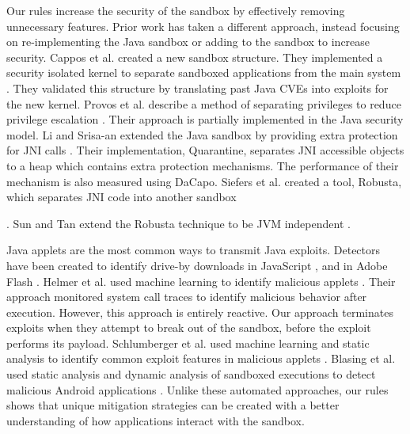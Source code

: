 \documentclass{sig-alternate}
\begin{document}
Our rules increase the security of the sandbox
by effectively removing unnecessary features. Prior work has taken a different
approach, instead focusing on re-implementing the Java sandbox or
adding to the sandbox to increase security. Cappos et al. created
a new sandbox structure. They implemented a security isolated kernel
to separate sandboxed applications from the main system \cite{cappos_retaining_2010}.
They validated this structure by translating past Java CVEs into exploits
for the new kernel. Provos et al. describe a method of separating
privileges to reduce privilege escalation \cite{Provos-PrivilegeEscalation}.
Their approach is partially implemented in the Java security model.
Li and Srisa-an extended the Java sandbox by providing extra protection
for JNI calls \cite{li_quarantine:_2011}. Their implementation, Quarantine,
separates JNI accessible objects to a heap which contains extra protection
mechanisms. The performance of their mechanism is also measured using
DaCapo. Siefers et al. created a tool, Robusta, which separates JNI
code into another sandbox \cite{siefers_robusta:_2010}%

. Sun and Tan extend the Robusta technique to be JVM independent \cite{sun_jvm-portable_2012}. 

Java applets are the most common ways to transmit Java exploits. Detectors
have been created to identify drive-by downloads in JavaScript \cite{cova_detection_2010},
and in Adobe Flash \cite{ford_analyzing_2009}. Helmer et al. used
machine learning to identify malicious applets \cite{helmer_anomalous_2001}.
Their approach monitored system call traces to identify malicious
behavior after execution. However, this approach is entirely reactive.
Our approach terminates exploits when they attempt to break out of
the sandbox, before the exploit performs its payload. Schlumberger
et al. used machine learning and static analysis to identify common
exploit features in malicious applets \cite{schlumberger_jarhead_2012}.
Blasing et al. used static analysis and dynamic analysis of sandboxed
executions to detect malicious Android applications \cite{Blasing-AndriodSandbox}.
Unlike these automated approaches, our rules shows that unique
mitigation strategies can be created with a better understanding of
how applications interact with the sandbox. 
\end{document}
